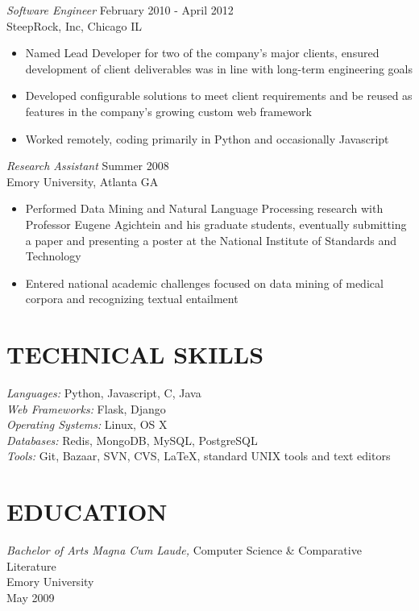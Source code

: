 \documentclass[line,margin]{res}
\begin{document}
\begin{resume}
        {\sl Software Engineer} \hfill February 2010 - April 2012 \\
        SteepRock, Inc, Chicago IL
        \begin{itemize}
        \item Named Lead Developer for two of the company's major
          clients, ensured development of client
          deliverables was in line with long-term engineering goals
        \item Developed configurable solutions to meet client
          requirements and be reused as features in the company's
          growing custom web framework
        \item Worked remotely, coding primarily in Python and
          occasionally Javascript
        \end{itemize}

        {\sl Research Assistant} \hfill Summer 2008 \\
        Emory University, Atlanta GA
        \begin{itemize}
        \item Performed Data Mining and Natural Language Processing research
          with Professor Eugene Agichtein and his graduate students,
          eventually submitting a paper and presenting a poster at the National
          Institute of Standards and Technology
        \item Entered national academic challenges focused on data
          mining of medical corpora and recognizing textual entailment
        \end{itemize}

\section{TECHNICAL SKILLS}
        {\sl Languages:} Python, Javascript, C, Java \\
        {\sl Web Frameworks:} Flask, Django \\
        {\sl Operating Systems:} Linux, OS X\\
        {\sl Databases:} Redis, MongoDB, MySQL, PostgreSQL \\
        {\sl Tools:} Git, Bazaar, SVN, CVS, \LaTeX, standard UNIX tools and
        text editors 

\section{EDUCATION}
        {\sl Bachelor of Arts Magna Cum Laude,}
        Computer Science \& Comparative Literature \\
        Emory University \\
        May 2009


\end{resume}
\end{document}
